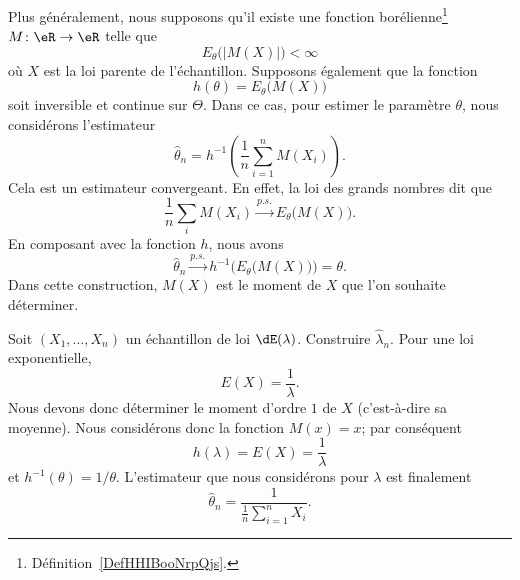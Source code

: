 Plus généralement, nous supposons qu'il existe une fonction borélienne\footnote{Définition~\ref{DefHHIBooNrpQjs}.} \( M\colon \eR\to \eR\) telle que
\begin{equation}
    E_{\theta}\big( | M(X) | \big)<\infty
\end{equation}
où \( X\) est la loi parente de l'échantillon. Supposons également que la fonction
\begin{equation}
    h(\theta)=E_{\theta}\big( M(X) \big)
\end{equation}
soit inversible et continue sur \( \Theta\). Dans ce cas, pour estimer le paramètre \( \theta\), nous considérons l'estimateur
\begin{equation}
    \hat\theta_n=h^{-1}\left( \frac{1}{ n }\sum_{i=1}^nM(X_i) \right).
\end{equation}
Cela est un estimateur convergeant. En effet, la loi des grands nombres dit que
\begin{equation}
    \frac{1}{ n }\sum_iM(X_i)\stackrel{p.s.}{\longrightarrow}E_{\theta}\big( M(X) \big).
\end{equation}
En composant avec la fonction \( h\), nous avons
\begin{equation}
    \hat\theta_n\stackrel{p.s.}{\longrightarrow}h^{-1}\Big( E_{\theta}\big( M(X) \big) \Big)=\theta.
\end{equation}
Dans cette construction, \( M(X)\) est le moment de \( X\) que l'on souhaite déterminer.

\begin{example}
    Soit \( (X_1,\ldots,X_n)\) un échantillon de loi \( \dE(\lambda)\). Construire \( \hat\lambda_n\). Pour une loi exponentielle,
    \begin{equation}
        E(X)=\frac{1}{ \lambda }.
    \end{equation}
    Nous devons donc déterminer le moment d'ordre \( 1\) de \( X\) (c'est-à-dire sa moyenne). Nous considérons donc la fonction \( M(x)=x\); par conséquent
    \begin{equation}
        h(\lambda)=E(X)=\frac{1}{ \lambda }
    \end{equation}
    et \( h^{-1}(\theta)=1/\theta\). L'estimateur que nous considérons pour \( \lambda\) est finalement
    \begin{equation}
        \hat\theta_n=\frac{1}{ \frac{1}{ n }\sum_{i=1}^nX_i }.
    \end{equation}
\end{example}

